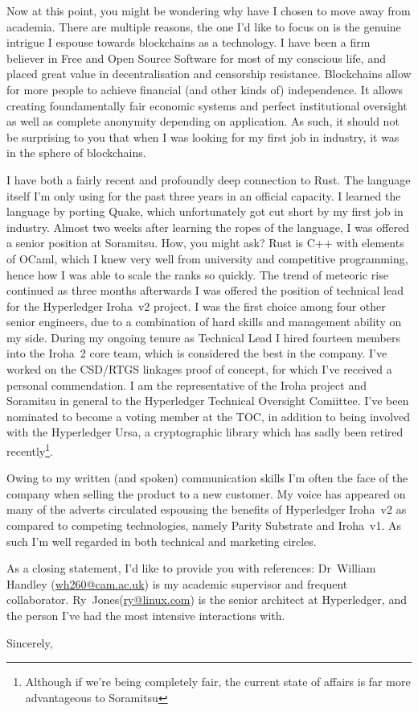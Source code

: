 \documentclass[11pt]{scrlttr2}
\begin{document}
\begin{letter}{
}
Now at this point, you might be wondering why have I chosen to move
away from academia. There are multiple reasons, the one I'd like to
focus on is the genuine intrigue I espouse towards blockchains as a
technology. I have been a firm believer in Free and Open Source
Software for most of my conscious life, and placed great value in
decentralisation and censorship resistance. Blockchains allow for more
people to achieve financial (and other kinds of) independence. It
allows creating foundamentally fair economic systems and perfect
institutional oversight as well as complete anonymity depending on
application. As such, it should not be surprising to you that when I
was looking for my first job in industry, it was in the sphere of
blockchains.

I have both a fairly recent and profoundly deep connection to
Rust. The language itself I'm only using for the past three years in
an official capacity. I learned the language by porting Quake, which
unfortunately got cut short by my first job in industry. Almost two
weeks after learning the ropes of the language, I was offered a senior
position at Soramitsu. How, you might ask? Rust is C++ with elements
of OCaml, which I knew very well from university and competitive
programming, hence how I was able to scale the ranks so quickly. The
trend of meteoric rise continued as three months afterwards I was
offered the position of technical lead for the Hyperledger Iroha~v2
project. I was the first choice among four other senior engineers, due
to a combination of hard skills and management ability on my side.
During my ongoing tenure as Technical Lead I hired fourteen members
into the Iroha~2 core team, which is considered the best in the
company. I've worked on the CSD/RTGS linkages proof of concept, for
which I've received a personal commendation. I am the representative
of the Iroha project and Soramitsu in general to the Hyperledger
Technical Oversight Comiittee. I've been nominated to become a voting
member at the TOC, in addition to being involved with the Hyperledger
Ursa, a cryptographic library which has sadly been retired
recently\footnote{Although if we're being completely fair, the current
  state of affairs is far more advantageous to Soramitsu}.

Owing to my written (and spoken) communication skills I'm often the
face of the company when selling the product to a new customer. My
voice has appeared on many of the adverts circulated espousing the
benefits of Hyperledger Iroha~v2 as compared to competing
technologies, namely Parity Substrate and Iroha~v1. As such I'm well
regarded in both technical and marketing circles.

As a closing statement, I'd like to provide you with references:
Dr~William Handley (\href{mailto:wh260@cam.ac.uk}{wh260@cam.ac.uk}) is
my academic supervisor and frequent
collaborator. Ry~Jones(\href{mailto:ry@linux.com}{ry@linux.com}) is
the senior architect at Hyperledger, and the person I've had the most
intensive interactions with.

Sincerely, \\
\end{letter}
\end{document}
